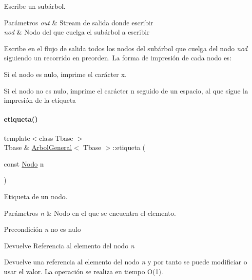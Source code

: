 Escribe un subárbol. 


\begin{DoxyParams}{Parámetros}
{\em out} & Stream de salida donde escribir \\
\hline
{\em nod} & Nodo del que cuelga el subárbol a escribir\\
\hline
\end{DoxyParams}
Escribe en el flujo de salida todos los nodos del subárbol que cuelga del nodo {\itshape nod} siguiendo un recorrido en preorden. La forma de impresión de cada nodo es\+:


\begin{DoxyItemize}
\item Si el nodo es nulo, imprime el carácter \textquotesingle{}x\textquotesingle{}.
\item Si el nodo no es nulo, imprime el carácter \textquotesingle{}n\textquotesingle{} seguido de un espacio, al que sigue la impresión de la etiqueta 
\end{DoxyItemize}\hypertarget{classArbolGeneral_a69781940bd69c1e473e0c4b2495cd7a1}{}\label{classArbolGeneral_a69781940bd69c1e473e0c4b2495cd7a1} 
\paragraph{\texorpdfstring{etiqueta()}{etiqueta()}\hspace{0.1cm}{\footnotesize\ttfamily [1/2]}}
{\footnotesize\ttfamily template$<$class Tbase $>$ \\
Tbase \& \hyperlink{classArbolGeneral}{Arbol\+General}$<$ Tbase $>$\+::etiqueta (\begin{DoxyParamCaption}\item[{const \hyperlink{classArbolGeneral_a12cc1b74a9095d89bc7334290d332f7a}{Nodo}}]{n }\end{DoxyParamCaption})}



Etiqueta de un nodo. 


\begin{DoxyParams}{Parámetros}
{\em n} & Nodo en el que se encuentra el elemento. \\
\hline
\end{DoxyParams}
\begin{DoxyPrecond}{Precondición}
{\itshape n} no es nulo 
\end{DoxyPrecond}
\begin{DoxyReturn}{Devuelve}
Referencia al elemento del nodo {\itshape n} 
\end{DoxyReturn}
Devuelve una referencia al elemento del nodo {\itshape n} y por tanto se puede modificiar o usar el valor. La operación se realiza en tiempo O(1). \hypertarget{classArbolGeneral_affb3c52c9c82ff2d3c4b9a8b5499b91c}{}\label{classArbolGeneral_affb3c52c9c82ff2d3c4b9a8b5499b91c} 
